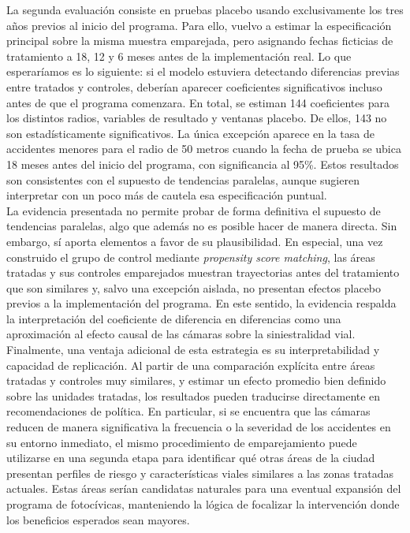 La segunda evaluación consiste en pruebas placebo usando exclusivamente los tres años previos al inicio del programa. Para ello, vuelvo a estimar la especificación principal sobre la misma muestra emparejada, pero asignando fechas ficticias de tratamiento a 18, 12 y 6 meses antes de la implementación real. Lo que esperaríamos es lo siguiente: si el modelo estuviera detectando diferencias previas entre tratados y controles, deberían aparecer coeficientes significativos incluso antes de que el programa comenzara. En total, se estiman 144 coeficientes para los distintos radios, variables de resultado y ventanas placebo. De ellos, 143 no son estadísticamente significativos. La única excepción aparece en la tasa de accidentes menores para el radio de 50 metros cuando la fecha de prueba se ubica 18 meses antes del inicio del programa, con significancia al 95\%. Estos resultados son consistentes con el supuesto de tendencias paralelas, aunque sugieren interpretar con un poco más de cautela esa especificación puntual.\\

La evidencia presentada no permite probar de forma definitiva el supuesto de tendencias paralelas, algo que además no es posible hacer de manera directa. Sin embargo, sí aporta elementos a favor de su plausibilidad. En especial, una vez construido el grupo de control mediante \emph{propensity score matching}, las áreas tratadas y sus controles emparejados muestran trayectorias antes del tratamiento que son similares y, salvo una excepción aislada, no presentan efectos placebo previos a la implementación del programa. En este sentido, la evidencia respalda la interpretación del coeficiente de diferencia en diferencias como una aproximación al efecto causal de las cámaras sobre la siniestralidad vial.\\

Finalmente, una ventaja adicional de esta estrategia es su interpretabilidad y capacidad de replicación. Al partir de una comparación explícita entre áreas tratadas y controles muy similares, y estimar un efecto promedio bien definido sobre las unidades tratadas, los resultados pueden traducirse directamente en recomendaciones de política. En particular, si se encuentra que las cámaras reducen de manera significativa la frecuencia o la severidad de los accidentes en su entorno inmediato, el mismo procedimiento de emparejamiento puede utilizarse en una segunda etapa para identificar qué otras áreas de la ciudad presentan perfiles de riesgo y características viales similares a las zonas tratadas actuales. Estas áreas serían candidatas naturales para una eventual expansión del programa de fotocívicas, manteniendo la lógica de focalizar la intervención donde los beneficios esperados sean mayores.\\ 
